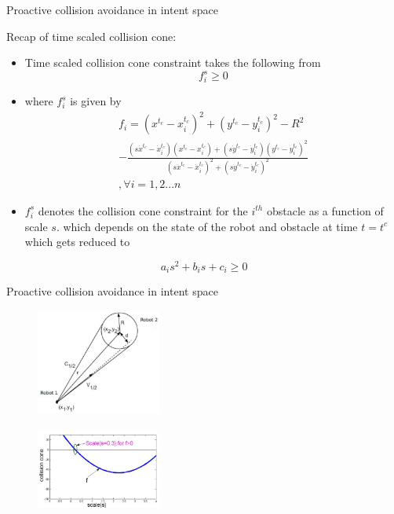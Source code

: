 \documentclass{beamer}
\begin{document}
\begin{frame}{Proactive collision avoidance in intent space}
\begin{block}{Recap of time scaled collision cone:}
\begin{itemize}
\item{Time scaled collision cone constraint takes the following from}
$$f_i^s \geq 0 $$
\item{where $f_i^s$ is given by}
\begin{eqnarray}\label{collcone}
 f_i= (x^{t_c}-x_i^{t_c})^2+(y^{t_c}-y_i^{t_c})^2- R^2\\ \nonumber- \frac{(s\dot{x}^{t_c}-\dot{x}_i^{t_c})(x^{t_c}-x_i^{t_c})+(s\dot{y}^{t_c}-\dot{y}_i^{t_c})(y^{t_c}-y_i^{t_c})^2}{(s\dot{x}^{t_c}-\dot{x}_i^{t_c})^2+(s\dot{y}^{t_c}-\dot{y}_i^{t_c})^2} \\\nonumber, \forall i = {1,2...n}
\end{eqnarray}

\item{$f_i^s$ denotes the collision cone constraint for the $i^{th}$ obstacle as a function of scale $s$. which depends on the state of the robot and obstacle at time $t=t^c$ which gets reduced to}
\end{itemize}
$$a_is^2+b_is+c_i \geq 0 $$
\end{block}
\end{frame}
\begin{frame}{Proactive collision avoidance in intent space}
\begin{figure}
\centering
\includegraphics[width= 4.1cm, height=3.5cm]{fig3.eps}
\\
\includegraphics[width= 4.1cm, height=3.5cm]{fig4.eps}
\end{figure}

\end{frame}
\end{document}
